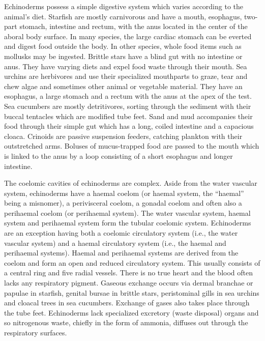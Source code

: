 \documentclass[]{book}
\begin{document}
Echinoderms possess a simple digestive system which varies according to the animal's diet. Starfish are mostly carnivorous and have a mouth, esophagus, two-part stomach, intestine and rectum, with the anus located in the center of the aboral body surface. In many species, the large cardiac stomach can be everted and digest food outside the body. In other species, whole food items such as mollusks may be ingested. Brittle stars have a blind gut with no intestine or anus. They have varying diets and expel food waste through their mouth. Sea urchins are herbivores and use their specialized mouthparts to graze, tear and chew algae and sometimes other animal or vegetable material. They have an esophagus, a large stomach and a rectum with the anus at the apex of the test. Sea cucumbers are mostly detritivores, sorting through the sediment with their buccal tentacles which are modified tube feet. Sand and mud accompanies their food through their simple gut which has a long, coiled intestine and a capacious cloaca. Crinoids are passive suspension feeders, catching plankton with their outstretched arms. Boluses of mucus-trapped food are passed to the mouth which is linked to the anus by a loop consisting of a short esophagus and longer intestine.

The coelomic cavities of echinoderms are complex. Aside from the water vascular system, echinoderms have a haemal coelom (or haemal system, the ``haemal'' being a misnomer), a perivisceral coelom, a gonadal coelom and often also a perihaemal coelom (or perihaemal system). The water vascular system, haemal system and perihaemal system form the tubular coelomic system. Echinoderms are an exception having both a coelomic circulatory system (i.e., the water vascular system) and a haemal circulatory system (i.e., the haemal and perihaemal systems). Haemal and perihaemal systems are derived from the coelom and form an open and reduced circulatory system. This usually consists of a central ring and five radial vessels. There is no true heart and the blood often lacks any respiratory pigment. Gaseous exchange occurs via dermal branchae or papulae in starfish, genital bursae in brittle stars, peristominal gills in sea urchins and cloacal trees in sea cucumbers. Exchange of gases also takes place through the tube feet. Echinoderms lack specialized excretory (waste disposal) organs and so nitrogenous waste, chiefly in the form of ammonia, diffuses out through the respiratory surfaces.
\end{document}
